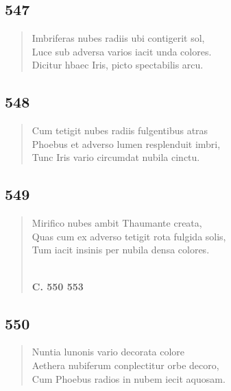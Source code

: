 \documentclass[11pt, a4paper]{report}
\begin{document}
            \subsection*{547}
      \begin{verse}
      Imbriferas nubes radiis ubi contigerit sol, \\ Luce sub adversa varios iacit unda colores. \\ Dicitur hbaec Iris, picto spectabilis arcu. \\ 
      \end{verse}
  
            \subsection*{548}
      \begin{verse}
      Cum tetigit nubes radiis fulgentibus atras \\ Phoebus et adverso lumen resplenduit imbri, \\ Tunc Iris vario circumdat nubila cinctu. \\ 
      \end{verse}
  
            \subsection*{549}
      \begin{verse}
      Mirifico nubes ambit Thaumante creata, \\ Quas cum ex adverso tetigit rota fulgida solis, \\ Tum iacit insinis per nubila densa colores. \\ 
        ﻿\pagebreak 
    \begin{center} \textbf{C. 550 553} \end{center} \marginpar{[71]} 
      \end{verse}
  
            \subsection*{550}
      \begin{verse}
      Nuntia lunonis vario decorata colore \\ Aethera nubiferum conplectitur orbe decoro, \\ Cum Phoebus radios in nubem iecit aquosam. \\ 
      \end{verse}
  
\end{document}
